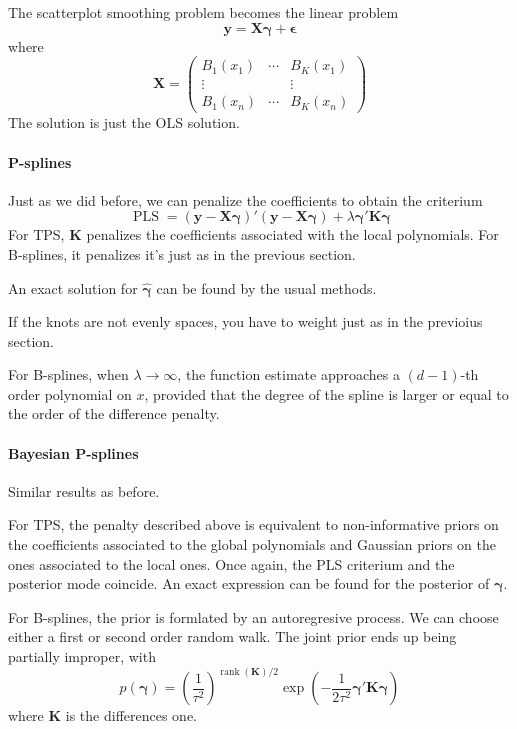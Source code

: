 \documentclass{article}
\DeclareMathOperator*{\PLS}{\operatorname{PLS}}
\DeclareMathOperator*{\rank}{\operatorname{rank}}
\begin{document}
    The scatterplot smoothing problem becomes the linear problem 
    \[\mathbf y = \mathbf X \boldsymbol\gamma + \boldsymbol\epsilon\]
    where 
    \[\mathbf X = \left(\begin{matrix}
        B_1(x_1) & \cdots & B_K(x_1) \\ 
        \vdots &&\vdots \\
        B_1(x_n) & \cdots & B_K(x_n) 
    \end{matrix}\right)\]
    The solution is just the OLS solution. 

    \paragraph{P-splines} 

    Just as we did before, we can penalize the coefficients to obtain the criterium 
    \[\PLS = (\mathbf y  - \mathbf X \boldsymbol \gamma)'(\mathbf y  - \mathbf X \boldsymbol \gamma) + \lambda \boldsymbol \gamma' \mathbf K \boldsymbol \gamma \]
    For TPS, \(\mathbf K\) penalizes the coefficients associated with the local polynomials. For B-splines, it penalizes it's just as in the previous section. 

    An exact solution for \(\hat {\boldsymbol \gamma}\) can be found by the usual methods. 

    If the knots are not evenly spaces, you have to weight just as in the previoius section. 

    For B-splines, when \(\lambda \rightarrow \infty\), the function estimate approaches a \((d - 1)\)-th order polynomial on \(x\), provided that the degree of the spline is larger or equal to the order of the difference penalty. 

    \paragraph{Bayesian P-splines} 

    Similar results as before.

    For TPS, the penalty described above is equivalent to non-informative priors on the coefficients associated to the global polynomials and Gaussian priors on the ones associated to the local ones. Once again, the PLS criterium and the posterior mode coincide. An exact expression can be found for the posterior of \(\boldsymbol \gamma\).

    For B-splines, the prior is formlated by an autoregresive process. We can choose either a first or second order random walk. The joint prior ends up being partially improper, with 
    \[p(\boldsymbol\gamma) = \left(\frac{1}{\tau^2}\right)^{\rank(\mathbf K)/2}\exp\left(-\frac{1}{2\tau^2} \boldsymbol \gamma' \mathbf K \boldsymbol\gamma \right)\]
    where \(\mathbf K\) is the differences one. 
\end{document}
